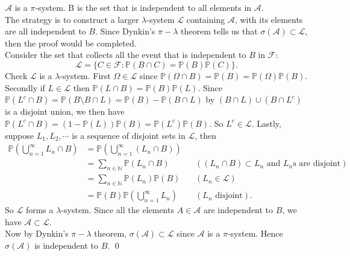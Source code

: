 \begin{answer}
    $\mathcal{A}$ is a $\pi$-system. B is the set that is independent to all elements in $\mathcal{A}$. \\
    The strategy is to construct a larger $\lambda$-system $\mathcal{L}$ containing $\mathcal{A}$, with its elements are all independent to $B$. Since Dynkin's $\pi-\lambda$ theorem tells us that $\sigma(\mathcal{A})\subset\mathcal{L}$, then the proof would be completed.\\
    Consider the set that collects all the event that is independent to $B$ in $\mathcal{F}$:
    \begin{equation*}
        \mathcal{L}=\{C\in\mathcal{F}:\mathbb{P}(B\cap C)=\mathbb{P}(B)\mathbb{P}(C)\}.
    \end{equation*}
    Check $\mathcal{L}$ is a $\lambda$-system. First $\Omega\in\mathcal{L}$ since $\mathbb{P}(\Omega\cap B)=\mathbb{P}(B)=\mathbb{P}(\Omega)\mathbb{P}(B)$. Secondly if $L\in\mathcal{L}$ then $\mathbb{P}(L\cap B) = \mathbb{P}(B)\mathbb{P}(L)$. Since $\mathbb{P}(L^c\cap B) = \mathbb{P}(B\setminus B\cap L)=\mathbb{P}(B)-\mathbb{P}(B\cap L)$ by $(B\cap L)\cup(B\cap L^c)$ is a disjoint union, we then have $\mathbb{P}(L^c\cap B) = (1-\mathbb{P}(L))\mathbb{P}(B)=\mathbb{P}(L^c)\mathbb{P}(B)$. So $L^c\in\mathcal{L}$. Lastly, suppose $L_1,L_2,\cdots$ is a sequence of disjoint sets in $\mathcal{L}$, then
    \begin{equation*}
        \begin{aligned}
                    \mathbb{P}(\bigcup^\infty_{n=1}L_n\cap B)&=\mathbb{P}(\bigcup^\infty_{n=1}(L_n\cap B)) \\
                    &=\sum_{n\in\mathbb{N}}\mathbb{P}(L_n\cap B) && (\text{$(L_n\cap B)\subset L_n$ and $L_n$s are disjoint}) \\
                    &=\sum_{n\in\mathbb{N}}\mathbb{P}(L_n)\mathbb{P}(B) && (L_n\in\mathcal{L}) \\
                    &=\mathbb{P}(B)\mathbb{P}(\bigcup^\infty_{n=1}L_n) && (L_n\text{  disjoint}).
        \end{aligned}
    \end{equation*}
    So $\mathcal{L}$ forms a $\lambda$-system. Since all the elements $A\in\mathcal{A}$ are independent to $B$, we have $\mathcal{A}\subset\mathcal{L}$.\\
    Now by Dynkin's $\pi-\lambda$ theorem, $\sigma(\mathcal{A})\subset\mathcal{L}$ since $\mathcal{A}$ is a $\pi$-system. Hence $\sigma(\mathcal{A})$ is independent to $B$.
    \qquad \qed
\end{answer}

